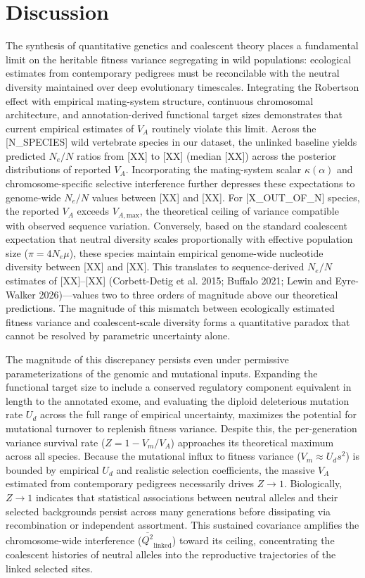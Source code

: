 \documentclass[12pt]{article}
\begin{document}
\section{Discussion}
The synthesis of quantitative genetics and coalescent theory places a fundamental limit on the heritable fitness variance segregating in wild populations: ecological estimates from contemporary pedigrees must be reconcilable with the neutral diversity maintained over deep evolutionary timescales. Integrating the Robertson effect with empirical mating-system structure, continuous chromosomal architecture, and annotation-derived functional target sizes demonstrates that current empirical estimates of $V_A$ routinely violate this limit. Across the [N\_SPECIES] wild vertebrate species in our dataset, the unlinked baseline yields predicted $N_e/N$ ratios from [XX] to [XX] (median [XX]) across the posterior distributions of reported $V_A$. Incorporating the mating-system scalar $\kappa(\alpha)$ and chromosome-specific selective interference further depresses these expectations to genome-wide $N_e/N$ values between [XX] and [XX]. For [X\_OUT\_OF\_N] species, the reported $V_A$ exceeds $V_{A,\text{max}}$, the theoretical ceiling of variance compatible with observed sequence variation. Conversely, based on the standard coalescent expectation that neutral diversity scales proportionally with effective population size ($\pi = 4N_e\mu$), these species maintain empirical genome-wide nucleotide diversity between [XX] and [XX]. This translates to sequence-derived $N_e/N$ estimates of [XX]–[XX] (Corbett-Detig et al. 2015; Buffalo 2021; Lewin and Eyre-Walker 2026)—values two to three orders of magnitude above our theoretical predictions. The magnitude of this mismatch between ecologically estimated fitness variance and coalescent-scale diversity forms a quantitative paradox that cannot be resolved by parametric uncertainty alone.

The magnitude of this discrepancy persists even under permissive parameterizations of the genomic and mutational inputs. Expanding the functional target size to include a conserved regulatory component equivalent in length to the annotated exome, and evaluating the diploid deleterious mutation rate $U_d$ across the full range of empirical uncertainty, maximizes the potential for mutational turnover to replenish fitness variance. Despite this, the per-generation variance survival rate ($Z = 1 - V_m/V_A$) approaches its theoretical maximum across all species. Because the mutational influx to fitness variance ($V_m \approx U_d s^2$) is bounded by empirical $U_d$ and realistic selection coefficients, the massive $V_A$ estimated from contemporary pedigrees necessarily drives $Z \to 1$. Biologically, $Z \to 1$ indicates that statistical associations between neutral alleles and their selected backgrounds persist across many generations before dissipating via recombination or independent assortment. This sustained covariance amplifies the chromosome-wide interference ($\overline{Q^2}_\text{linked}$) toward its ceiling, concentrating the coalescent histories of neutral alleles into the reproductive trajectories of the linked selected sites.
\end{document}
